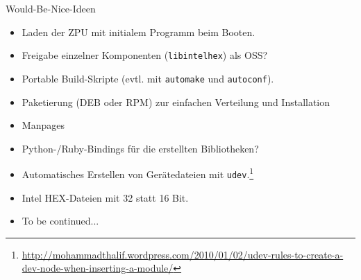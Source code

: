\documentclass[10pt]{beamer}
\begin{document}
	\begin{frame}{Would-Be-Nice-Ideen}
		\begin{itemize}
			\item Laden der ZPU mit initialem Programm beim Booten.
			\item Freigabe einzelner Komponenten (\texttt{libintelhex}) als OSS?
			\item Portable Build-Skripte (evtl. mit \texttt{automake} und \texttt{autoconf}).
			\item Paketierung (DEB oder RPM) zur einfachen Verteilung und Installation
			\item Manpages
			\item Python-/Ruby-Bindings für die erstellten Bibliotheken?
			\item Automatisches Erstellen von Gerätedateien mit \texttt{udev}.\footnote{\url{http://mohammadthalif.wordpress.com/2010/01/02/udev-rules-to-create-a-dev-node-when-inserting-a-module/}}
			\item Intel HEX-Dateien mit 32 statt 16 Bit.
			\item To be continued...
		\end{itemize}
	\end{frame}
\end{document}

